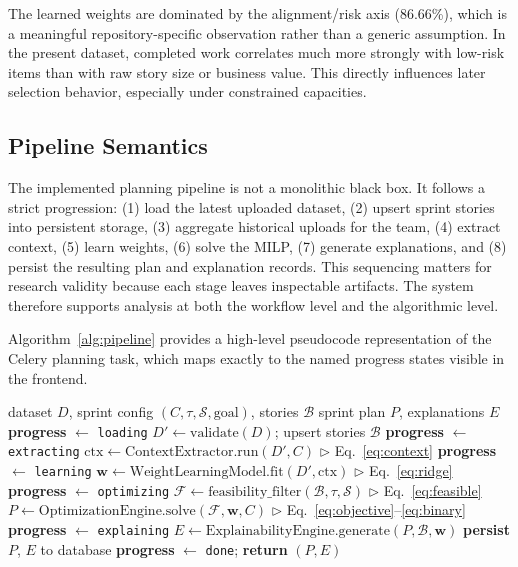 \documentclass[conference]{IEEEtran}
\begin{document}
The learned weights are dominated by the alignment/risk axis (86.66\%), which is a
meaningful repository-specific observation rather than a generic assumption.
In the present dataset, completed work correlates much more strongly with low-risk
items than with raw story size or business value.
This directly influences later selection behavior, especially under constrained
capacities.

\subsection{Pipeline Semantics}

The implemented planning pipeline is not a monolithic black box.
It follows a strict progression: (1) load the latest uploaded dataset, (2) upsert
sprint stories into persistent storage, (3) aggregate historical uploads for the
team, (4) extract context, (5) learn weights, (6) solve the MILP, (7) generate
explanations, and (8) persist the resulting plan and explanation records.
This sequencing matters for research validity because each stage leaves inspectable
artifacts.
The system therefore supports analysis at both the workflow level and the
algorithmic level.

Algorithm~\ref{alg:pipeline} provides a high-level pseudocode representation of
the Celery planning task, which maps exactly to the named progress states visible
in the frontend.

\begin{algorithm}[t]
\caption{ApexS Asynchronous Planning Pipeline}
\label{alg:pipeline}
\begin{algorithmic}[1]
\Require dataset $D$, sprint config $(C, \tau, \mathcal{S}, \text{goal})$, stories $\mathcal{B}$
\Ensure sprint plan $P$, explanations $E$
\State \textbf{progress} $\leftarrow$ \texttt{loading}
\State $D' \leftarrow \text{validate}(D)$; upsert stories $\mathcal{B}$
\State \textbf{progress} $\leftarrow$ \texttt{extracting}
\State $\text{ctx} \leftarrow \text{ContextExtractor.run}(D', C)$
      \hfill $\triangleright$ Eq.~\ref{eq:context}
\State \textbf{progress} $\leftarrow$ \texttt{learning}
\State $\mathbf{w} \leftarrow \text{WeightLearningModel.fit}(D', \text{ctx})$
      \hfill $\triangleright$ Eq.~\ref{eq:ridge}
\State \textbf{progress} $\leftarrow$ \texttt{optimizing}
\State $\mathcal{F} \leftarrow \text{feasibility\_filter}(\mathcal{B}, \tau, \mathcal{S})$
      \hfill $\triangleright$ Eq.~\ref{eq:feasible}
\State $P \leftarrow \text{OptimizationEngine.solve}(\mathcal{F}, \mathbf{w}, C)$
      \hfill $\triangleright$ Eq.~\ref{eq:objective}--\ref{eq:binary}
\State \textbf{progress} $\leftarrow$ \texttt{explaining}
\State $E \leftarrow \text{ExplainabilityEngine.generate}(P, \mathcal{B}, \mathbf{w})$
\State \textbf{persist} $P$, $E$ to database
\State \textbf{progress} $\leftarrow$ \texttt{done}; \textbf{return} $(P, E)$
\end{algorithmic}
\end{algorithm}
\end{document}
